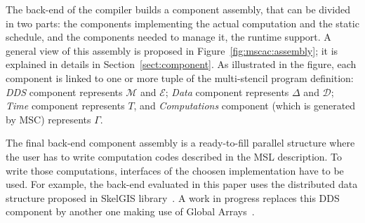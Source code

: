 
The back-end of the compiler builds a component assembly, that can be divided in two parts: the components implementing the actual computation and the static schedule, and the components needed to manage it, \ie the runtime support. A general view of this assembly is proposed in Figure~\ref{fig:mscac:assembly}; it is explained in details in Section~\ref{sect:component}. As illustrated in the figure, each component is linked to one or more tuple of the multi-stencil program definition: \emph{DDS} component represents $\mathcal{M}$ and $\mathcal{E}$; \emph{Data} component represents $\Delta$ and $\mathcal{D}$; \emph{Time} component represents $T$, and \emph{Computations} component (which is generated by MSC) represents $\Gamma$.

The final back-end component assembly is a ready-to-fill parallel structure where the user has to write computation codes described in the MSL description. To write those computations, interfaces of the choosen implementation have to be used. For example, the back-end evaluated in this paper uses the distributed data structure proposed in SkelGIS library~\cite{CPE:CPE3494}. A work in progress replaces this DDS component by another one making use of Global Arrays~\cite{Nieplocha:2006:AAP:1125980.1125985}.

